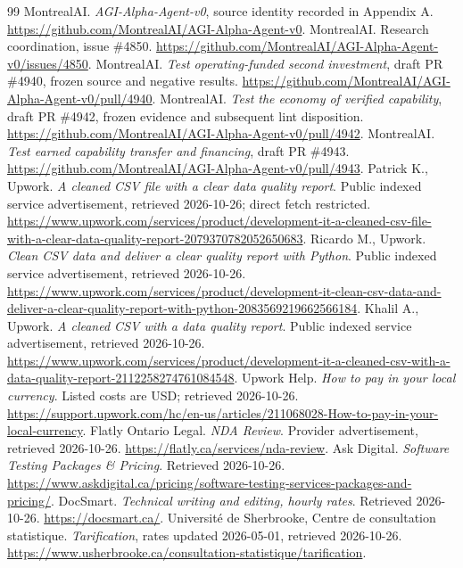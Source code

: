 \documentclass[11pt,letterpaper]{article}
\begin{document}
\begin{thebibliography}{99}\small
{} MontrealAI. \emph{AGI-Alpha-Agent-v0}, source identity recorded in Appendix A. \url{https://github.com/MontrealAI/AGI-Alpha-Agent-v0}.
 MontrealAI. Research coordination, issue \#4850. \url{https://github.com/MontrealAI/AGI-Alpha-Agent-v0/issues/4850}.
 MontrealAI. \emph{Test operating-funded second investment}, draft PR \#4940, frozen source and negative results. \url{https://github.com/MontrealAI/AGI-Alpha-Agent-v0/pull/4940}.
 MontrealAI. \emph{Test the economy of verified capability}, draft PR \#4942, frozen evidence and subsequent lint disposition. \url{https://github.com/MontrealAI/AGI-Alpha-Agent-v0/pull/4942}.
 MontrealAI. \emph{Test earned capability transfer and financing}, draft PR \#4943. \url{https://github.com/MontrealAI/AGI-Alpha-Agent-v0/pull/4943}.
 Patrick K., Upwork. \emph{A cleaned CSV file with a clear data quality report}. Public indexed service advertisement, retrieved 2026-10-26; direct fetch restricted. \url{https://www.upwork.com/services/product/development-it-a-cleaned-csv-file-with-a-clear-data-quality-report-2079370782052650683}.
 Ricardo M., Upwork. \emph{Clean CSV data and deliver a clear quality report with Python}. Public indexed service advertisement, retrieved 2026-10-26. \url{https://www.upwork.com/services/product/development-it-clean-csv-data-and-deliver-a-clear-quality-report-with-python-2083569219662566184}.
 Khalil A., Upwork. \emph{A cleaned CSV with a data quality report}. Public indexed service advertisement, retrieved 2026-10-26. \url{https://www.upwork.com/services/product/development-it-a-cleaned-csv-with-a-data-quality-report-2112258274761084548}.
 Upwork Help. \emph{How to pay in your local currency}. Listed costs are USD; retrieved 2026-10-26. \url{https://support.upwork.com/hc/en-us/articles/211068028-How-to-pay-in-your-local-currency}.
 Flatly Ontario Legal. \emph{NDA Review}. Provider advertisement, retrieved 2026-10-26. \url{https://flatly.ca/services/nda-review}.
 Ask Digital. \emph{Software Testing Packages \& Pricing}. Retrieved 2026-10-26. \url{https://www.askdigital.ca/pricing/software-testing-services-packages-and-pricing/}.
 DocSmart. \emph{Technical writing and editing, hourly rates}. Retrieved 2026-10-26. \url{https://docsmart.ca/}.
 Universit\'e de Sherbrooke, Centre de consultation statistique. \emph{Tarification}, rates updated 2026-05-01, retrieved 2026-10-26. \url{https://www.usherbrooke.ca/consultation-statistique/tarification}.

\end{thebibliography}
\end{document}
